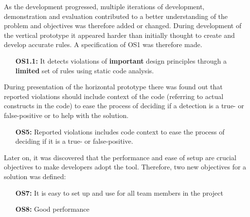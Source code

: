 \documentclass{report}
\begin{document}
As the development progressed, multiple iterations of development, demonstration and evaluation contributed to a better understanding of the problem and objectives was   therefore added or changed. During development of the vertical prototype it appeared harder than initially thought to create and develop accurate rules. A specification of OS1 was therefore made. 

\begin{itemize}
    \item [\textbf{OS1.1:}] It detects violations of \textbf{important} design principles through a \textbf{limited} set of rules using static code analysis.
\end{itemize}

During presentation of the horizontal prototype there was found out that reported violations should include context of the code (referring to actual constructs in the code) to ease the process of deciding if a detection is a true- or false-positive or to help with the solution. 

\begin{itemize}
        \item [\textbf{OS5:}] Reported violations includes code context to ease the process of deciding if it is a true- or false-positive. 
\end{itemize}

Later on, it was discovered that the performance and ease of setup are crucial objectives to make developers adopt the tool. Therefore, two new objectives for a solution was defined:
\begin{itemize}
    \item [\textbf{OS7:}] It is easy to set up and use for all team members in the project
    \item [\textbf{OS8:}] Good performance
\end{itemize}




\end{document}

